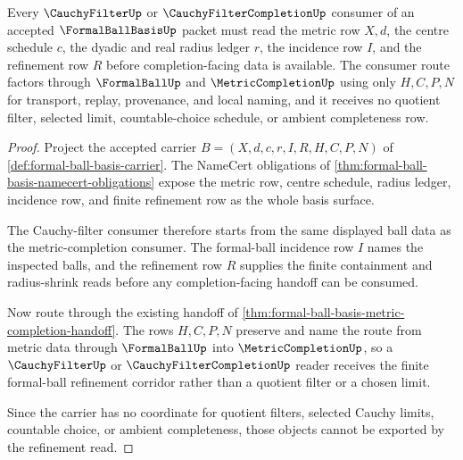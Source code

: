 \begin{theorem}
\label{thm:formal-ball-basis-cauchy-filter-refinement}
Every $\CauchyFilterUp$ or $\CauchyFilterCompletionUp$ consumer of an accepted $\FormalBallBasisUp$ packet must read the metric row $X,d$, the centre schedule $c$, the dyadic and real radius ledger $r$, the incidence row $I$, and the refinement row $R$ before completion-facing data is available. The consumer route factors through $\FormalBallUp$ and $\MetricCompletionUp$ using only $H,C,P,N$ for transport, replay, provenance, and local naming, and it receives no quotient filter, selected limit, countable-choice schedule, or ambient completeness row.
\end{theorem}
\begin{proof}
Project the accepted carrier $B=(X,d,c,r,I,R,H,C,P,N)$ of \autoref{def:formal-ball-basis-carrier}. The NameCert obligations of \autoref{thm:formal-ball-basis-namecert-obligations} expose the metric row, centre schedule, radius ledger, incidence row, and finite refinement row as the whole basis surface.

The Cauchy-filter consumer therefore starts from the same displayed ball data as the metric-completion consumer. The formal-ball incidence row $I$ names the inspected balls, and the refinement row $R$ supplies the finite containment and radius-shrink reads before any completion-facing handoff can be consumed.

Now route through the existing handoff of \autoref{thm:formal-ball-basis-metric-completion-handoff}. The rows $H,C,P,N$ preserve and name the route from metric data through $\FormalBallUp$ into $\MetricCompletionUp$, so a $\CauchyFilterUp$ or $\CauchyFilterCompletionUp$ reader receives the finite formal-ball refinement corridor rather than a quotient filter or a chosen limit.

Since the carrier has no coordinate for quotient filters, selected Cauchy limits, countable choice, or ambient completeness, those objects cannot be exported by the refinement read.
\end{proof}




